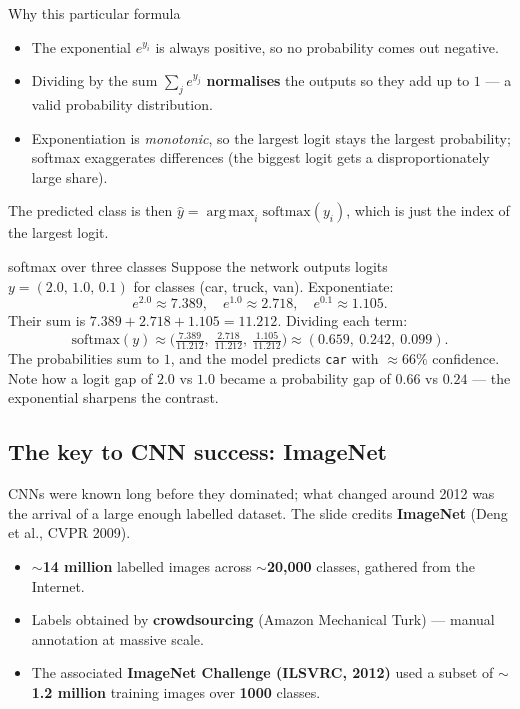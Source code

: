 \documentclass{report}
\DeclareMathOperator*{\argmax}{arg\,max}
\begin{document}
\begin{defbox}{Why this particular formula}
\begin{itemize}
\item The exponential $e^{y_i}$ is always positive, so no probability comes out
negative.
\item Dividing by the sum $\sum_j e^{y_j}$ \textbf{normalises} the outputs so
they add up to $1$ --- a valid probability distribution.
\item Exponentiation is \emph{monotonic}, so the largest logit stays the
largest probability; softmax exaggerates differences (the biggest logit gets a
disproportionately large share).
\end{itemize}
The predicted class is then $\hat{y}=\argmax_i \mathrm{softmax}(y_i)$, which is
just the index of the largest logit.
\end{defbox}

\begin{exbox}{softmax over three classes}
Suppose the network outputs logits $y=(2.0,\,1.0,\,0.1)$ for classes
(car, truck, van). Exponentiate:
\[
e^{2.0}\approx 7.389,\quad e^{1.0}\approx 2.718,\quad e^{0.1}\approx 1.105 .
\]
Their sum is $7.389+2.718+1.105 = 11.212$. Dividing each term:
\[
\mathrm{softmax}(y)\approx
\Big(\tfrac{7.389}{11.212},\ \tfrac{2.718}{11.212},\ \tfrac{1.105}{11.212}\Big)
\approx (0.659,\ 0.242,\ 0.099).
\]
The probabilities sum to $1$, and the model predicts \texttt{car} with
$\approx 66\%$ confidence. Note how a logit gap of $2.0$ vs $1.0$ became a
probability gap of $0.66$ vs $0.24$ --- the exponential sharpens the contrast.
\end{exbox}

\subsection{The key to CNN success: ImageNet}

CNNs were known long before they dominated; what changed around 2012 was the
arrival of a large enough labelled dataset. The slide credits
\textbf{ImageNet} (Deng et al., CVPR 2009).

\begin{itemize}
\item $\sim$\textbf{14 million} labelled images across $\sim$\textbf{20{,}000}
classes, gathered from the Internet.
\item Labels obtained by \textbf{crowdsourcing} (Amazon Mechanical Turk) ---
manual annotation at massive scale.
\item The associated \textbf{ImageNet Challenge (ILSVRC, 2012)} used a subset of
$\sim$\textbf{1.2 million} training images over \textbf{1000} classes.
\end{itemize}
\end{document}
